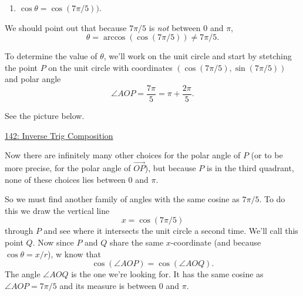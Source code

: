 \documentclass{ximera}
\begin{document}
\begin{question}
\begin{explanation}
\begin{enumerate}
\item $\cos \theta =  \cos(7\pi/5))$.
\end{enumerate}

We should point out that because $7\pi/5$ is \emph{not} between $0$ and $\pi$,
\[
   \theta =   \arccos (\cos (7\pi/5)) \neq 7\pi/5 .
\]

To determine the value of $\theta$, we'll work on the unit circle and start by stetching the point $P$ on the unit circle with coordinates $(\cos (7\pi/5), \sin(7\pi/5))$ and polar angle 
\[
     \angle AOP =  \frac{7\pi}{5} = \pi + \frac{2\pi}{5} .
\]

See the picture below.


\begin{onlineOnly}
    \begin{center}
\end{center}
\end{onlineOnly}

\href{https://www.desmos.com/calculator/0cac410789}{142: Inverse Trig Composition}

Now there are infinitely many other choices for the polar angle of $P$ (or to be more precise, for the polar angle of $\overrightarrow{OP}$), but because $P$ is in the third quadrant, none of these choices lies between $0$ and $\pi$. 

So we must find another family of angles with the same cosine as $7\pi/5$. To do this we draw the vertical line
\[
   x = \cos(7\pi/5)
\]
through $P$ and see where it intersects the unit circle a second time. We'll call this point $Q$. Now since $P$ and $Q$ share the same $x$-coordinate (and because $\cos\theta = x/r$), w know that
\[
 \cos (\angle AOP) = \cos (\angle AOQ).
\]
The angle $\angle AOQ$ is the one we're looking for. It has the same cosine as $\angle AOP = 7\pi/5$ and its measure is between $0$ and $\pi$. 





\end{explanation}
\end{question}
\end{document}
